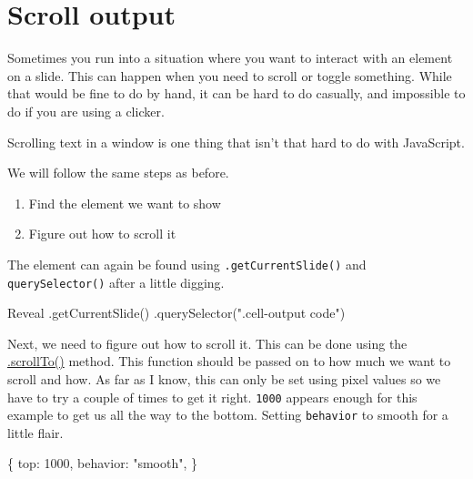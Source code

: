 \documentclass[
  letterpaper,
  DIV=11,
  numbers=noendperiod]{scrreprt}
\newenvironment{Shaded}{\begin{snugshade}}{\end{snugshade}}
\newcommand{\DataTypeTok}[1]{\textcolor[rgb]{0.68,0.00,0.00}{#1}}
\newcommand{\DecValTok}[1]{\textcolor[rgb]{0.68,0.00,0.00}{#1}}
\newcommand{\FunctionTok}[1]{\textcolor[rgb]{0.28,0.35,0.67}{#1}}
\newcommand{\NormalTok}[1]{\textcolor[rgb]{0.00,0.23,0.31}{#1}}
\newcommand{\OperatorTok}[1]{\textcolor[rgb]{0.37,0.37,0.37}{#1}}
\newcommand{\StringTok}[1]{\textcolor[rgb]{0.13,0.47,0.30}{#1}}
\providecommand{\tightlist}{%
  \setlength{\itemsep}{0pt}\setlength{\parskip}{0pt}}\usepackage{longtable,booktabs,array}
\begin{document}
\section{Scroll output}\label{scroll-output}

Sometimes you run into a situation where you want to interact with an
element on a slide. This can happen when you need to scroll or toggle
something. While that would be fine to do by hand, it can be hard to do
casually, and impossible to do if you are using a clicker.

Scrolling text in a window is one thing that isn't that hard to do with
JavaScript.

We will follow the same steps as before.

\begin{enumerate}
\def\labelenumi{\arabic{enumi}.}
\tightlist
\item
  Find the element we want to show
\item
  Figure out how to scroll it
\end{enumerate}

The element can again be found using \texttt{.getCurrentSlide()} and
\texttt{querySelector()} after a little digging.

\begin{Shaded}
\begin{Highlighting}[]
\NormalTok{Reveal}
  \OperatorTok{.}\FunctionTok{getCurrentSlide}\NormalTok{()}
  \OperatorTok{.}\FunctionTok{querySelector}\NormalTok{(}\StringTok{".cell{-}output code"}\NormalTok{)}
\end{Highlighting}
\end{Shaded}

Next, we need to figure out how to scroll it. This can be done using the
\href{https://developer.mozilla.org/en-US/docs/Web/API/Window/scrollTo}{.scrollTo()}
method. This function should be passed on to how much we want to scroll
and how. As far as I know, this can only be set using pixel values so we
have to try a couple of times to get it right. \texttt{1000} appears
enough for this example to get us all the way to the bottom. Setting
\texttt{behavior} to smooth for a little flair.

\begin{Shaded}
\begin{Highlighting}[]
\NormalTok{\{}
  \DataTypeTok{top}\OperatorTok{:} \DecValTok{1000}\OperatorTok{,}
  \DataTypeTok{behavior}\OperatorTok{:} \StringTok{"smooth"}\OperatorTok{,}
\NormalTok{\}}
\end{Highlighting}
\end{Shaded}
\end{document}
